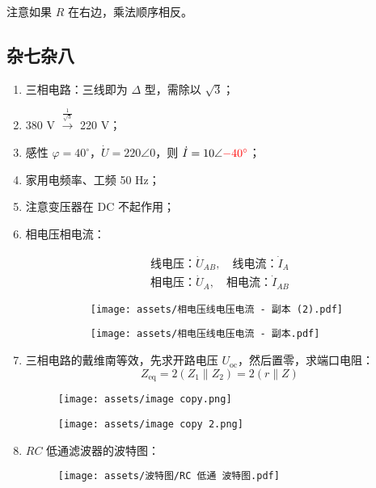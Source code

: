 \documentclass[a4paper]{article}  %
\theoremstyle{MyLineTheoremStyle} %
\theoremstyle{MyBlockTheoremStyle} %
\theoremstyle{MySubsubsectionStyle} %
\begin{document}
\begin{multicols*}{4}
注意如果 $R$ 在右边，乘法顺序相反。

\subsection{杂七杂八}
\begin{enumerate}
    \item 三相电路：三线即为 $\Delta$ 型，需除以 $\sqrt{3}$；
\item 380 V $\overset{\frac{1}{\sqrt{3}}}{\longrightarrow}$ 220 V；
\item 感性 $\varphi = 40^\circ $，$\dot{U} = 220 \angle 0$，则 $\dot{I} = 10 \angle {\color{red} -40^\circ}$；
\item 家用电频率、工频 50 Hz；
\item {\color{red} 注意变压器在 DC 不起作用}；
\item 相电压相电流：

\begin{gather}
\text{线电压：} \dot{U}_{AB}, \quad \text{线电流：} \dot{I}_A \\
\text{相电压：} \dot{U}_A, \quad \text{相电流：} \dot{I}_{AB}
\end{gather}
\begin{figure}[H]\centering
\begin{subfigure}[b]{0.5\columnwidth}\centering
    \texttt{[image: assets/相电压线电压电流 - 副本 (2).pdf]}
\end{subfigure}\hfill
\begin{subfigure}[b]{0.5\columnwidth}\centering
    \texttt{[image: assets/相电压线电压电流 - 副本.pdf]}
\end{subfigure}
\end{figure}

\item 三相电路的戴维南等效，先求开路电压 $U_{\text{oc}}$，然后置零，求端口电阻：
\begin{equation}
Z_{\text{eq}} = 2 \left( Z_1 \parallel Z_2 \right) = 2 \left( r \parallel Z \right)
\end{equation}
\begin{figure}[H]\centering
    \texttt{[image: assets/image copy.png]}
\end{figure}
\begin{figure}[H]\centering
    \texttt{[image: assets/image copy 2.png]}
\end{figure}

\item $RC$ 低通滤波器的波特图：
\begin{figure}[H]\centering
    \texttt{[image: assets/波特图/RC 低通 波特图.pdf]}
\end{figure} 


\end{enumerate}
\end{multicols*}
\end{document}
